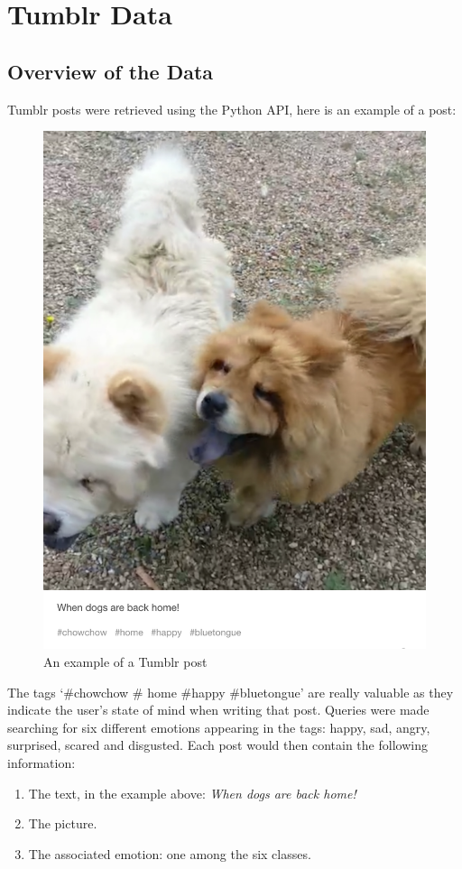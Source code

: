 \chapter{Tumblr Data}

\section{Overview of the Data}
Tumblr posts were retrieved using the Python API, here is an example of a post:
\begin{figure}[H]
\centering
\includegraphics[width=.58\textwidth]{Images/chowchow.png}
\caption{An example of a Tumblr post}
\end{figure}

The tags `\#chowchow \# home \#happy \#bluetongue' are really valuable as they indicate the user's state of mind when writing that post. Queries were made searching for six different emotions appearing in the tags: happy, sad, angry, surprised, scared and disgusted. Each post would then contain the following information:
\begin{enumerate}
\item The text, in the example above: \textit{When dogs are back home!}
\item The picture.
\item The associated emotion: one among the six classes.
\end{enumerate}

